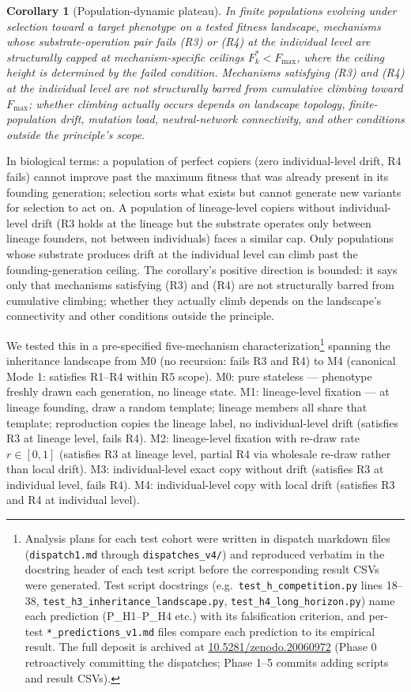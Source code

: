 \documentclass[aps,prx,reprint,amsmath,amssymb,floatfix,superscriptaddress,nofootinbib]{revtex4-2}
\newcommand{\zenodoDOI}{\href{https://doi.org/10.5281/zenodo.20060972}{10.5281/zenodo.20060972}}
\theoremstyle{plain-thm}
\newtheorem{corollary}[theorem]{Corollary}
\theoremstyle{definition-thm}
\begin{document}
\begin{corollary}[Population-dynamic plateau]
\label{cor:plateau}
In finite populations evolving under selection toward a target phenotype on a tested fitness landscape, mechanisms whose substrate-operation pair fails (R3) or (R4) at the individual level are structurally capped at mechanism-specific ceilings $F^*_k < F_{\max}$, where the ceiling height is determined by the failed condition. Mechanisms satisfying (R3) and (R4) at the individual level are not structurally barred from cumulative climbing toward $F_{\max}$; whether climbing actually occurs depends on landscape topology, finite-population drift, mutation load, neutral-network connectivity, and other conditions outside the principle's scope.
\end{corollary}

In biological terms: a population of perfect copiers (zero individual-level drift, R4 fails) cannot improve past the maximum fitness that was already present in its founding generation; selection sorts what exists but cannot generate new variants for selection to act on. A population of lineage-level copiers without individual-level drift (R3 holds at the lineage but the substrate operates only between lineage founders, not between individuals) faces a similar cap. Only populations whose substrate produces drift at the individual level can climb past the founding-generation ceiling. The corollary's positive direction is bounded: it says only that mechanisms satisfying (R3) and (R4) are not structurally barred from cumulative climbing; whether they actually climb depends on the landscape's connectivity and other conditions outside the principle.

We tested this in a pre-specified five-mechanism characterization\footnote{Analysis plans for each test cohort were written in dispatch markdown files (\texttt{dispatch1.md} through \texttt{dispatches\_v4/}) and reproduced verbatim in the docstring header of each test script before the corresponding result CSVs were generated. Test script docstrings (e.g.\ \texttt{test\_h\_competition.py} lines 18--38, \texttt{test\_h3\_inheritance\_landscape.py}, \texttt{test\_h4\_long\_horizon.py}) name each prediction (P\_H1--P\_H4 etc.) with its falsification criterion, and per-test \texttt{*\_predictions\_v1.md} files compare each prediction to its empirical result. The full deposit is archived at \zenodoDOI{} (Phase 0 retroactively committing the dispatches; Phase 1--5 commits adding scripts and result CSVs).} spanning the inheritance landscape from M0 (no recursion: fails R3 and R4) to M4 (canonical Mode 1: satisfies R1--R4 within R5 scope). M0: pure stateless --- phenotype freshly drawn each generation, no lineage state. M1: lineage-level fixation --- at lineage founding, draw a random template; lineage members all share that template; reproduction copies the lineage label, no individual-level drift (satisfies R3 at lineage level, fails R4). M2: lineage-level fixation with re-draw rate $r \in [0, 1]$ (satisfies R3 at lineage level, partial R4 via wholesale re-draw rather than local drift). M3: individual-level exact copy without drift (satisfies R3 at individual level, fails R4). M4: individual-level copy with local drift (satisfies R3 and R4 at individual level).
\end{document}
